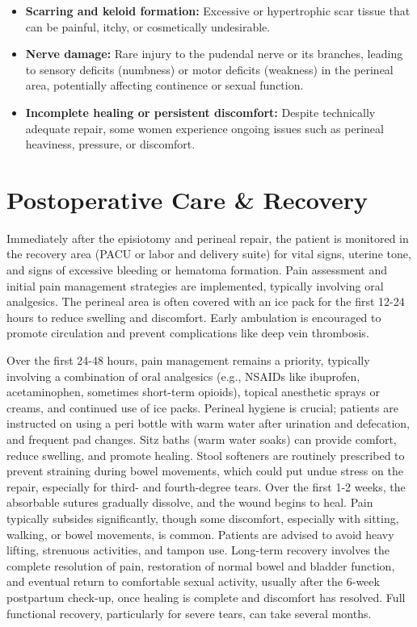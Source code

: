 \begin{itemize}
\begin{itemize}
    \item \textbf{Scarring and keloid formation:} Excessive or hypertrophic scar tissue that can be painful, itchy, or cosmetically undesirable.
    \item \textbf{Nerve damage:} Rare injury to the pudendal nerve or its branches, leading to sensory deficits (numbness) or motor deficits (weakness) in the perineal area, potentially affecting continence or sexual function.
    \item \textbf{Incomplete healing or persistent discomfort:} Despite technically adequate repair, some women experience ongoing issues such as perineal heaviness, pressure, or discomfort.
  \end{itemize}
\end{itemize}

\section*{Postoperative Care \& Recovery}
Immediately after the episiotomy and perineal repair, the patient is monitored in the recovery area (PACU or labor and delivery suite) for vital signs, uterine tone, and signs of excessive bleeding or hematoma formation. Pain assessment and initial pain management strategies are implemented, typically involving oral analgesics. The perineal area is often covered with an ice pack for the first 12-24 hours to reduce swelling and discomfort. Early ambulation is encouraged to promote circulation and prevent complications like deep vein thrombosis.

Over the first 24-48 hours, pain management remains a priority, typically involving a combination of oral analgesics (e.g., NSAIDs like ibuprofen, acetaminophen, sometimes short-term opioids), topical anesthetic sprays or creams, and continued use of ice packs. Perineal hygiene is crucial; patients are instructed on using a peri bottle with warm water after urination and defecation, and frequent pad changes. Sitz baths (warm water soaks) can provide comfort, reduce swelling, and promote healing. Stool softeners are routinely prescribed to prevent straining during bowel movements, which could put undue stress on the repair, especially for third- and fourth-degree tears. Over the first 1-2 weeks, the absorbable sutures gradually dissolve, and the wound begins to heal. Pain typically subsides significantly, though some discomfort, especially with sitting, walking, or bowel movements, is common. Patients are advised to avoid heavy lifting, strenuous activities, and tampon use. Long-term recovery involves the complete resolution of pain, restoration of normal bowel and bladder function, and eventual return to comfortable sexual activity, usually after the 6-week postpartum check-up, once healing is complete and discomfort has resolved. Full functional recovery, particularly for severe tears, can take several months.


